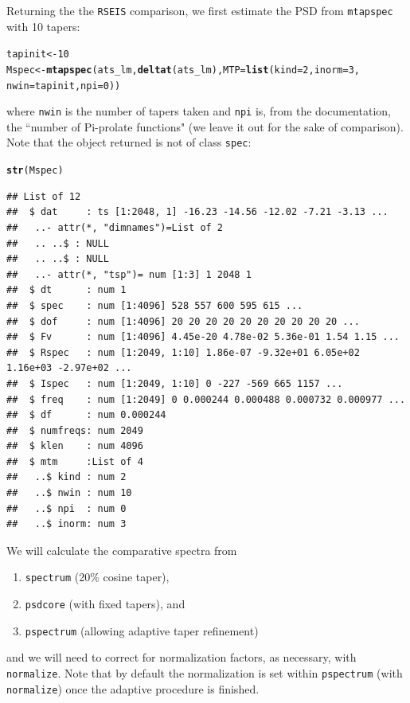 \documentclass[10pt]{article}\usepackage[]{graphicx}\usepackage[]{color}
\makeatletter
\newcommand{\hlnum}[1]{\textcolor[rgb]{0.686,0.059,0.569}{#1}}%
\newcommand{\hlstd}[1]{\textcolor[rgb]{0.345,0.345,0.345}{#1}}%
\newcommand{\hlkwb}[1]{\textcolor[rgb]{0.69,0.353,0.396}{#1}}%
\newcommand{\hlkwc}[1]{\textcolor[rgb]{0.333,0.667,0.333}{#1}}%
\newcommand{\hlkwd}[1]{\textcolor[rgb]{0.737,0.353,0.396}{\textbf{#1}}}%
\newenvironment{kframe}{%
 \def\at@end@of@kframe{}%
 \ifinner\ifhmode%
  \def\at@end@of@kframe{\end{minipage}}%
  \begin{minipage}{\columnwidth}%
 \fi\fi%
 \def\FrameCommand##1{\hskip\@totalleftmargin \hskip-\fboxsep
 \colorbox{shadecolor}{##1}\hskip-\fboxsep
     \hskip-\linewidth \hskip-\@totalleftmargin \hskip\columnwidth}%
 \MakeFramed {\advance\hsize-\width
   \@totalleftmargin\z@ \linewidth\hsize
   \@setminipage}}%
 {\par\unskip\endMakeFramed%
 \at@end@of@kframe}
\newenvironment{knitrout}{}{} %
\newcommand{\Rcmd}[1]{\texttt{#1}}
\makeatother
\begin{document}
Returning the the \Rcmd{RSEIS} comparison, we first 
estimate the PSD from \Rcmd{mtapspec} with 10 tapers:
\begin{knitrout}\small
{}\color{fgcolor}\begin{kframe}
\begin{alltt}
\hlstd{tapinit} \hlkwb{<-} \hlnum{10}
\hlstd{Mspec} \hlkwb{<-} \hlkwd{mtapspec}\hlstd{(ats_lm,} \hlkwd{deltat}\hlstd{(ats_lm),} \hlkwc{MTP} \hlstd{=} \hlkwd{list}\hlstd{(}\hlkwc{kind} \hlstd{=} \hlnum{2}\hlstd{,} \hlkwc{inorm} \hlstd{=} \hlnum{3}\hlstd{,}
    \hlkwc{nwin} \hlstd{= tapinit,} \hlkwc{npi} \hlstd{=} \hlnum{0}\hlstd{))}
\end{alltt}
\end{kframe}
\end{knitrout}
where \Rcmd{nwin} is the number of tapers taken and
\Rcmd{npi} is, from the documentation, the ``number of Pi-prolate functions" (we
leave it out for the sake of comparison). 
Note that the object returned
is not of class \Rcmd{spec}:
\begin{knitrout}\small
{}\color{fgcolor}\begin{kframe}
\begin{alltt}
\hlkwd{str}\hlstd{(Mspec)}
\end{alltt}
\begin{verbatim}
## List of 12
##  $ dat     : ts [1:2048, 1] -16.23 -14.56 -12.02 -7.21 -3.13 ...
##   ..- attr(*, "dimnames")=List of 2
##   .. ..$ : NULL
##   .. ..$ : NULL
##   ..- attr(*, "tsp")= num [1:3] 1 2048 1
##  $ dt      : num 1
##  $ spec    : num [1:4096] 528 557 600 595 615 ...
##  $ dof     : num [1:4096] 20 20 20 20 20 20 20 20 20 20 ...
##  $ Fv      : num [1:4096] 4.45e-20 4.78e-02 5.36e-01 1.54 1.15 ...
##  $ Rspec   : num [1:2049, 1:10] 1.86e-07 -9.32e+01 6.05e+02 1.16e+03 -2.97e+02 ...
##  $ Ispec   : num [1:2049, 1:10] 0 -227 -569 665 1157 ...
##  $ freq    : num [1:2049] 0 0.000244 0.000488 0.000732 0.000977 ...
##  $ df      : num 0.000244
##  $ numfreqs: num 2049
##  $ klen    : num 4096
##  $ mtm     :List of 4
##   ..$ kind : num 2
##   ..$ nwin : num 10
##   ..$ npi  : num 0
##   ..$ inorm: num 3
\end{verbatim}
\end{kframe}
\end{knitrout}

We will calculate the comparative spectra
from
\begin{enumerate}
  \item \Rcmd{spectrum} (20\% cosine taper),
  \item \Rcmd{psdcore} (with fixed tapers), and
  \item \Rcmd{pspectrum} (allowing adaptive taper refinement)
\end{enumerate}
and we will need to correct for normalization factors, as necessary, with
\Rcmd{normalize}. Note that by default the normalization is
set within \Rcmd{pspectrum} (with \Rcmd{normalize}) once the adaptive procedure
is finished.
\end{document}
